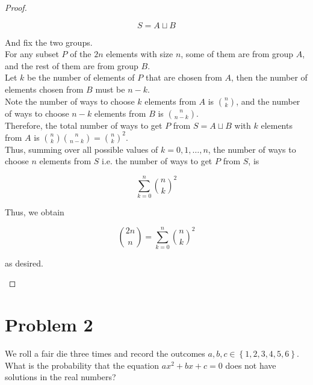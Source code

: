\begin{proof}
\begin{itemize}
  \[\mathit{S} = \mathit{A} \sqcup \mathit{B}\]

  And fix the two groups.\\
  For any subset \(\mathit{P}\) of the \(2\mathit{n}\) elements with size \(\mathit{n}\), some of them are from group \(\mathit{A}\), and the rest of them are from group \(\mathit{B}\).\\
  Let \(\mathit{k}\) be the number of elements of \(\mathit{P}\) that are chosen from \(\mathit{A}\), then the number of elements chosen from \(\mathit{B}\) must be \(\mathit{n} - \mathit{k}\).\\
  Note the number of ways to choose \(\mathit{k}\) elements from \(\mathit{A}\) is \(\binom{\mathit{n}}{\mathit{k}}\), and the number of ways to choose \(\mathit{n} - \mathit{k}\) elements from \(\mathit{B}\) is \(\binom{\mathit{n}}{\mathit{n} - \mathit{k}}\).\\
  Therefore, the total number of ways to get \(\mathit{P}\) from \(\mathit{S} = \mathit{A} \sqcup \mathit{B}\) with \(\mathit{k}\) elements from \(\mathit{A}\) is \(\binom{\mathit{n}}{\mathit{k}}\binom{\mathit{n}}{\mathit{n} - \mathit{k}} = \binom{\mathit{n}}{\mathit{k}}^{2}\).\\
  Thus, summing over all possible values of \(\mathit{k} = 0,1,\ldots,\mathit{n}\), the number of ways to choose \(\mathit{n}\) elements from \(\mathit{S}\) i.e. the number of ways to get \(\mathit{P}\) from \(\mathit{S}\), is

  \[\sum\limits_{\mathit{k} = 0}^{\mathit{n}}\binom{\mathit{n}}{\mathit{k}}^{2}\]

  Thus, we obtain

  \[\binom{2\mathit{n}}{\mathit{n}} = \sum\limits_{\mathit{k} = 0}^{\mathit{n}}\binom{\mathit{n}}{\mathit{k}}^{2}\]

  as desired.
\end{itemize}

\end{proof}

\section{Problem 2}\label{hw01-problem-2}

We roll a fair die three times and record the outcomes \(\mathit{a},\mathit{b},\mathit{c} \in \left\{ {1,2,3,4,5,6} \right\}\). What is the probability that the equation \(\mathit{a}\mathit{x}^{2} + \mathit{b}\mathit{x} + \mathit{c} = 0\) does not have solutions in the real numbers?

